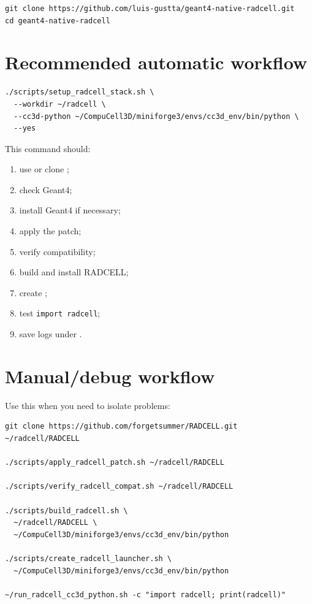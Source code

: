 \documentclass[11pt,a4paper,twoside,pdftex]{refrep}
\begin{document}
\begin{lstlisting}
git clone https://github.com/luis-gustta/geant4-native-radcell.git
cd geant4-native-radcell
\end{lstlisting}

\section{Recommended automatic workflow}

\begin{lstlisting}
./scripts/setup_radcell_stack.sh \
  --workdir ~/radcell \
  --cc3d-python ~/CompuCell3D/miniforge3/envs/cc3d_env/bin/python \
  --yes
\end{lstlisting}

This command should:

\begin{enumerate}
  \item use or clone ;
  \item check Geant4;
  \item install Geant4 if necessary;
  \item apply the patch;
  \item verify compatibility;
  \item build and install RADCELL;
  \item create ;
  \item test \texttt{import radcell};
  \item save logs under .
\end{enumerate}

\section{Manual/debug workflow}

Use this when you need to isolate problems:

\begin{lstlisting}
git clone https://github.com/forgetsummer/RADCELL.git ~/radcell/RADCELL

./scripts/apply_radcell_patch.sh ~/radcell/RADCELL

./scripts/verify_radcell_compat.sh ~/radcell/RADCELL

./scripts/build_radcell.sh \
  ~/radcell/RADCELL \
  ~/CompuCell3D/miniforge3/envs/cc3d_env/bin/python

./scripts/create_radcell_launcher.sh \
  ~/CompuCell3D/miniforge3/envs/cc3d_env/bin/python

~/run_radcell_cc3d_python.sh -c "import radcell; print(radcell)"
\end{lstlisting}
\end{document}
